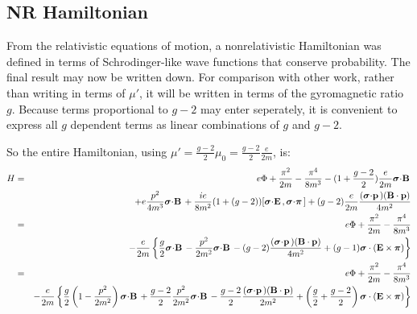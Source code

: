 \subsection*{NR Hamiltonian}
From the relativistic equations of motion, a nonrelativistic Hamiltonian was defined in terms of Schrodinger-like wave functions that conserve probability.  The final result may now be written down.  For comparison with other work, rather than writing in terms of $\mu'$, it will be written in terms of the gyromagnetic ratio $g$.  Because terms proportional to $g-2$ may enter seperately, it is convenient to express all $g$ dependent terms as linear combinations of $g$ and $g-2$. 

So the entire Hamiltonian, using $\mu' = \frac{g-2}{2}\mu_0 = \frac{g-2}{2}\frac{e}{2m} $, is:
\begin{eqnarray*}
H	&=&
		e\Phi  + \frac{ \pi^2}{2m} -\frac{\pi^4}{8m^3} - (1 + \frac{g-2}{2})\frac{e}{2m} \sigdot{B}	\\
	&&
		 + e \frac{p^2}{4m^3}\sigdot{B} + \frac{ie}{8m^2}(1 + (g-2))[\sigdot{E},\sigdotg{\pi}]
		 + (g-2) \frac{e}{2m}  \frac{ (\sigdot{p}) (\v{B} \cdot \v{p}) }{4m^2}  	\\
	&=&
		e\Phi  + \frac{ \pi^2}{2m} -\frac{\pi^4}{8m^3} 
	\\&&
		- \frac{e}{2m} \left\{
			\frac{g}{2}\sigdot{B} - \frac{p^2}{2m^2}\sigdot{B}
			- (g-2) \frac{ (\sigdot{p}) (\v{B} \cdot \v{p}) }{4m^2} 
			+(g-1) \gv{\sigma} \cdot (\v{E} \times \gv{\pi})
		\right \}	\\
	&=&
		e\Phi  + \frac{ \pi^2}{2m} -\frac{\pi^4}{8m^3} 
	\\&&
		- \frac{e}{2m} \left\{
			\frac{g}{2} \left( 1 - \frac{p^2}{2m^2} \right) \sigdot{B} + \frac{g-2}{2} \frac{p^2}{2m^2}\sigdot{B}
			- \frac{g-2}{2} \frac{ (\sigdot{p}) (\v	{B} \cdot \v{p}) }{2m^2} 
			+\left(\frac{g}{2} + \frac{g-2}{2}\right) \gv{\sigma} \cdot (\v{E} \times \gv{\pi})
		\right \}	\\	
\end{eqnarray*}
 
 
 